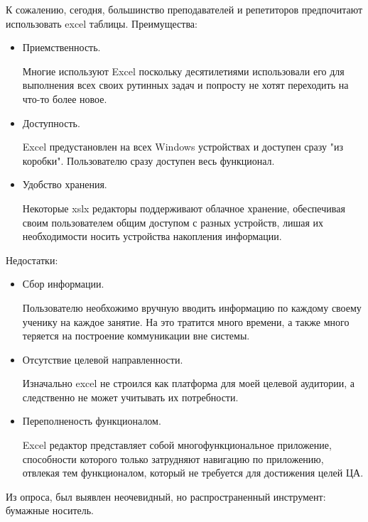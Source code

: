 \documentclass{disser}
\begin{document}
К сожалению, сегодня, большинство преподавателей и репетиторов предпочитают использовать excel таблицы.
Преимущества:
\begin{itemize}
    \item Приемственность. 
    
    Многие используют Excel поскольку десятилетиями использовали его для выполнения всех своих рутинных задач и попросту не хотят переходить на что-то более новое.
    \item Доступность. 
    
    Excel предустановлен на всех Windows устройствах и доступен сразу "из коробки". Пользователю сразу доступен весь функционал.
    \item Удобство хранения. 
    
    Некоторые xslx редакторы поддерживают облачное хранение, обеспечивая своим пользователем общим доступом с разных устройств, лишая их необходимости носить устройства накопления информации.
\end{itemize}
Недостатки:
\begin{itemize}
    \item Сбор информации. 
    
    Пользователю необхожимо вручную вводить информацию по каждому своему ученику на каждое занятие. На это тратится много времени, а также много теряется на построение коммуникации вне системы.
    \item Отсутствие целевой направленности. 
    
    Изначально excel не строился как платформа для моей целевой аудитории, а следственно не может учитывать их потребности. 
    \item Переполненость функционалом. 
    
    Excel редактор представляет собой многофункциональное приложение, способности которого только затрудняют навигацию по приложению, отвлекая тем функционалом, который не требуется для достижения целей ЦА.
\end{itemize}

Из опроса, был выявлен неочевидный, но распространенный инструмент: бумажные носитель.
\end{document}
